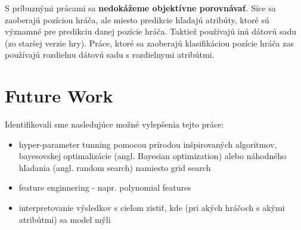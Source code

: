 \documentclass[runningheads]{llncs}
\begin{document}
S príbuznými prácami sa \textbf{nedokážeme objektívne porovnávať}. Síce sa zaoberajú pozíciou hráča, ale miesto predikcie hľadajú atribúty, ktoré sú významné pre predikciu danej pozície hráča. Taktiež používajú inú dátovú sadu (zo staršej verzie hry). Práce, ktoré sa zaoberajú klasifikáciou pozície hráča zas používajú rozdielnu dátovú sadu s rozdielnymi atribútmi.

\section{Future Work}

Identifikovali sme nasledujúce možné vylepšenia tejto práce:

\begin{itemize}
    \item hyper-parameter tunning pomocou prírodou inšpirovaných algoritmov, bayesovskej optimalizácie (angl. Bayesian optimization) alebo náhodného hľadania (angl. random search) namiesto grid search
    \item feature enginnering - napr. polynomial features
    \item interpretovanie výsledkov s cieľom zistiť, kde (pri akých hráčoch s akými atribútmi) sa model mýli
\end{itemize}

\newpage



\end{document}

